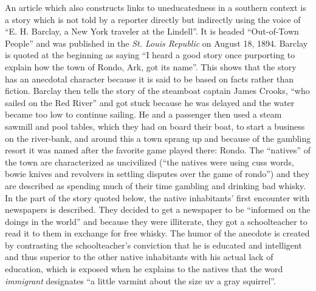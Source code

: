An article which also constructs links to uneducatedness in a southern context is a story which is not told by a reporter directly but indirectly using the voice of “E. H. Barclay, a New York traveler at the Lindell”. It is headed “Out-of-Town People” and was published in the \emph{St. Louis Republic} on August 18, 1894. Barclay is quoted at the beginning as saying “I heard a good story once purporting to explain how the town of Rondo, Ark, got its name”. This shows that the story has an anecdotal character because it is said to be based on facts rather than fiction. Barclay then tells the story of the steamboat captain James Crooks, “who sailed on the Red River” and got stuck because he was delayed and the water became too low to continue sailing. He and a passenger then used a steam sawmill and pool tables, which they had on board their boat, to start a business on the river-bank, and around this a town sprang up and because of the gambling resort it was named after the favorite game played there: Rondo. The “natives” of the town are characterized as uncivilized (“the natives were using cuss words, bowie knives and revolvers in settling disputes over the game of rondo”) and they are described as spending much of their time gambling and drinking bad whisky. In the part of the story quoted below, the native inhabitants’ first encounter with newspapers is described. They decided to get a newspaper to be “informed on the doings in the world” and because they were illiterate, they got a schoolteacher to read it to them in exchange for free whisky. The humor of the anecdote is created by contrasting the schoolteacher’s conviction that he is educated and intelligent and thus superior to the other native inhabitants with his actual lack of education, which is exposed when he explains to the natives that the word \emph{immigrant} designates “a little varmint about the size uv a gray squirrel”.

